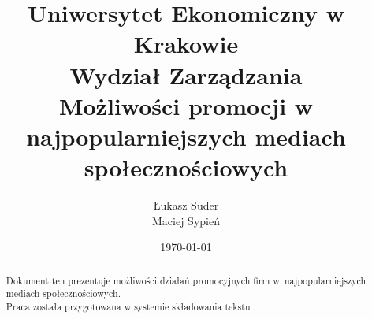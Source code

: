 \documentclass[12pt, oneside, a4paper]{article}
\title{
	\LARGE{Uniwersytet Ekonomiczny w Krakowie}\\
	\vspace{0,3cm}
	\Large{Wydział Zarządzania}\\
	\vspace{3cm}
	\Huge{Możliwości promocji w najpopularniejszych mediach społecznościowych}
	\vspace{2cm}
}
\author{Łukasz Suder\\ Maciej Sypień}
\date{\today}
\theoremstyle{plain}
\theoremstyle{definition}
\theoremstyle{remark}
\begin{document}
\nocite{*}     %

\maketitle     %

\begin{abstract}
Dokument ten prezentuje możliwości działań promocyjnych firm w~najpopularniejszych mediach społecznościowych.\\
Praca została przygotowana w systemie składowania tekstu \LaTeXe .
\end{abstract}

\clearpage
\tableofcontents     %
\clearpage





\printbibliography
\end{document}
